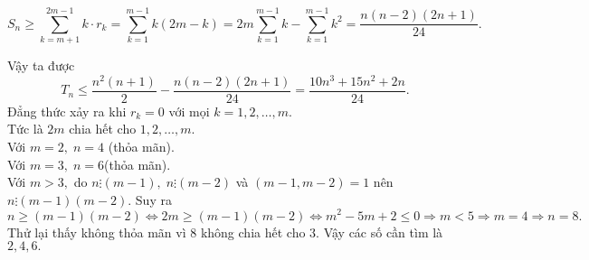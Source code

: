 \begin{bt}
{\begin{itemize}
		$$ S_n\geq \sum_{k=m+1}^{2m-1}k\cdot r_k=\sum_{k=1}^{m-1}k\left ( 2m-k \right )=2m\sum_{k=1}^{m-1}k-\sum_{k=1}^{m-1}k^2=\frac{n\left ( n-2 \right )\left ( 2n+1 \right )}{24}. $$
	\end{itemize}
		Vậy ta được
		$$T_n\leq \frac{n^2\left ( n+1 \right )}{2}-\frac{n\left ( n-2 \right )\left ( 2n+1 \right )}{24}=\frac{10n^3+15n^2+2n}{24}. $$
		Đẳng thức xảy ra khi $r_k=0$ với mọi $k=1,2,\ldots ,m.$\\
		Tức là $2m$ chia hết cho $1,2,\ldots ,m.$\\
		Với $m=2,\;n=4$ (thỏa mãn).\\
		Với $m=3,\;n=6$(thỏa mãn).\\
		Với $m>3,$ do $ n\vdots \left ( m-1 \right ),\;n\vdots \left ( m-2 \right )$ và $\left ( m-1,m-2 \right )=1 $ nên $n\vdots \left ( m-1 \right )\left ( m-2 \right ). $  Suy ra $$n\geq \left ( m-1 \right )\left ( m-2 \right )\Leftrightarrow 2m\geq \left ( m-1 \right )\left ( m-2 \right )\Leftrightarrow m^2-5m+2\leq 0\Rightarrow m<5\Rightarrow m=4\Rightarrow n=8.$$ Thử lại thấy không thỏa mãn vì $8$ không chia hết cho $3$. Vậy các số cần tìm là $2,4,6.$
	}
\end{bt}

